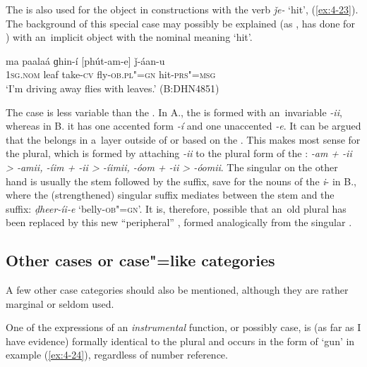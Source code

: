 The  is also used for the object in constructions with the verb \textit{ǰe-} `hit', (\ref{ex:4-23}). The background of this special case may possibly be explained (as \citealt[43]{baart1999a}, has done for  ) with an~implicit object with the nominal meaning `hit'.

\begin{exe}
\ex
\label{ex:4-23}
\gll ma paalaá ɡhin-í [phút-am-e] ǰ-áan-u \\
	\textsc{1sg.nom} leaf take-\textsc{cv} fly-\textsc{ob.pl"=gn} hit-\textsc{prs"=msg} \\
\glt `I'm driving away flies with leaves.' (B:DHN4851)
\end{exe}

The  case  is less variable than the . In A., the  is formed with an~invariable \textit{-ii}, whereas in B. it has one accented form \textit{-í} and one unaccented \textit{-e}. It can be argued that the  belongs in a~layer outside of or based on the . This makes most sense for the  plural, which is formed by attaching \textit{-ii} to the  plural form of the : \textit{-am + -ii {\textgreater} -amii, -íim + -ii {\textgreater} -íimii, -óom + -ii {\textgreater} -óomii}. The  singular on the other hand is usually the  stem followed by the  suffix, save for the nouns of the \textit{i}- in B., where the (strengthened)  singular suffix mediates between the stem and the  suffix: \textit{ḍheer-íi-e} `belly-\textsc{ob"=gn}'. It is, therefore, possible that an~old  plural has been replaced by this new ``peripheral'' , formed analogically from the singular .

\subsection{Other cases or case"=like categories}
\label{subsec:4-5-4}

A few other case categories should also be mentioned, although they are rather marginal or seldom used. 


One of the expressions of an \textit{instrumental} function, or possibly case, is (as far as I have evidence) formally identical to the  plural and occurs in the form of `gun' in example (\ref{ex:4-24}), regardless of number reference. 


